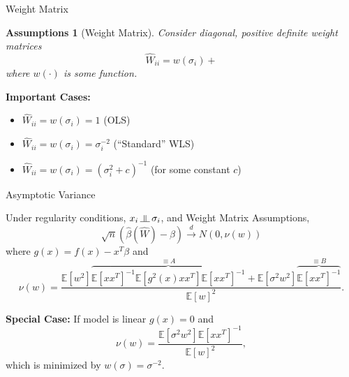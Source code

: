 \documentclass[12pt]{beamer}
\newcommand{\E}{\mathbb{E}}
\newcommand{\rightarrowd}{\overset{d}{\to}}
\newcommand{\indep}{\rotatebox[origin=c]{90}{$\models$}}
\newtheorem{assumptions}{Assumptions}
\begin{document}
\begin{frame}{Weight Matrix}

  \begin{assumptions}[Weight Matrix]
  Consider diagonal, positive definite weight matrices
  \begin{equation*}
    \widehat{W}_{ii} = w(\sigma_i) +
  \end{equation*}
  where $w(\cdot)$ is some function.
  \end{assumptions}

  \vspace{.2in}
  
  \textbf{Important Cases:}
  \begin{itemize}
  \item $\widehat{W}_{ii} = w(\sigma_{i}) = 1$ (OLS)
  \item $\widehat{W}_{ii} = w(\sigma_{i}) = \sigma_{i}^{-2}$ (``Standard'' WLS)
  \item $\widehat{W}_{ii} = w(\sigma_{i}) = (\sigma_{i}^{2} + c)^{-1}$ (for some constant $c$)
  \end{itemize}
\end{frame}

\begin{frame}{Asymptotic Variance}

  \vspace{-.05in}
  
  \begin{theorem}
    Under regularity conditions, $x_i \, \indep \, \sigma_i$, and Weight Matrix Assumptions,
  \begin{equation*}
    \sqrt{n}(\widehat{\beta}(\widehat{W}) - \beta) \rightarrowd N(0,\nu(w))
  \end{equation*}
  where $g(x) = f(x) - x^T\beta$ and
  \begin{equation*}
    \nu(w) = \frac{\E[w^2]\overbrace{\E[xx^T]^{-1}\E[g^2(x)xx^T]\E[xx^T]^{-1}}^{\equiv A} + \E[\sigma^2w^2]\overbrace{\E[xx^T]^{-1}}^{\equiv B}}{\E[w]^2}.
  \end{equation*}
  \end{theorem}

  \vspace{-.05in}
  
  \textbf{Special Case:}
   If model is linear $g(x)=0$ and
    \begin{equation*}
      \nu(w) = \frac{\E[\sigma^2w^2]\E[xx^T]^{-1}}{\E[w]^2},
    \end{equation*}
   which is minimized by $w(\sigma) = \sigma^{-2}$.
  
\end{frame}
\end{document}
